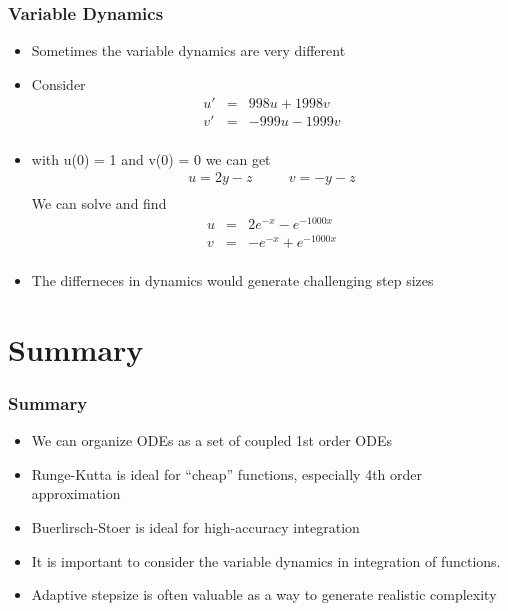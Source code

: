 \documentclass[10pt]{beamer}
\begin{document}
\begin{frame}
  \frametitle{Variable Dynamics}
  \begin{itemize}
  \item Sometimes the variable dynamics are very different
  \item Consider
    \[
      \begin{array}{rcl}
        u' & = & 998 u + 1998 v\\
        v' & = & -999u - 1999 v\\
      \end{array}
    \]
  \item with u(0) = 1 and v(0) = 0 we can get
    \[
      \begin{array}{rcl}
        u = 2 y - z & \mbox{~~~}& v = -y -z \\
      \end{array}
    \]
    We can solve and find
    \[
      \begin{array}{rcl}
        u & = & 2 e^{-x} - e^{-1000x}\\
        v & = & - e^{-x} + e^{-1000x}\\
      \end{array}
    \]
  \item The differneces in dynamics would generate challenging step sizes
  \end{itemize}
\end{frame}

\section{Summary}

\begin{frame}
  \frametitle{Summary}
  \begin{itemize}
  \item We can organize ODEs as a set of coupled 1st order ODEs
  \item Runge-Kutta is ideal for ``cheap'' functions, especially 4th
    order approximation
  \item Buerlirsch-Stoer is ideal for high-accuracy integration
  \item It is important to consider the variable dynamics in
    integration of functions.
  \item Adaptive stepsize is often valuable as a way to generate
    realistic complexity
  \end{itemize}
\end{frame}
\end{document}
